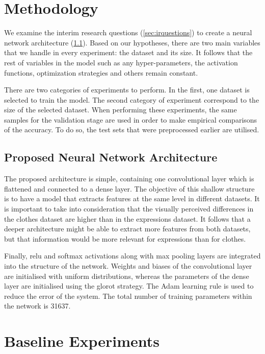\documentclass{article}
\begin{document}
\section{Methodology}
\label{sec:methodology}
We examine the interim research questions (\ref{sec:irquestions}) to create a neural network architecture (\ref{sec:arch}). Based on our hypotheses, there are two main variables that we handle in every experiment: the dataset and its size. It follows that the rest of variables in the model such as any hyper-parameters, the activation functions, optimization strategies and others remain constant.

There are two categories of experiments to perform. In the first, one dataset is selected to train the model. The second category of experiment correspond to the size of the selected dataset. When performing these experiments, the same samples for the validation stage are used in order to make empirical comparisons of the accuracy. To do so, the test sets that were preprocessed earlier are utilised.


\subsection{Proposed Neural Network Architecture}
\label{sec:arch}

The proposed architecture is simple, containing one convolutional layer which is flattened and connected to a dense layer. The objective of this shallow structure is to have a model that extracts features at the same level in different datasets. It is important to take into consideration that the visually perceived differences in the clothes dataset are higher than in the expressions dataset. It follows that a deeper architecture might be able to extract more features from both datasets, but that information would be more relevant for expressions than for clothes.

Finally, relu and softmax activations along with max pooling layers are integrated into the structure of the network. Weights and biases of the convolutional layer are initialised with uniform distributions, whereas the parameters of the dense layer are initialised using the glorot strategy. The Adam learning rule is used to reduce the error of the system. The total number of training parameters within the network is 31637. 


\section{Baseline Experiments}
\label{sec:baseline}
\end{document}
